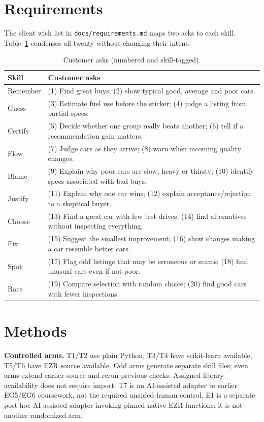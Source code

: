 \documentclass[sigconf,nonacm]{acmart}
\begin{document}
\section{Requirements}
The client wish list in \texttt{docs/requirements.md} maps two asks to each skill. Table~\ref{tab:req} condenses all twenty without changing their intent.
\begin{table}[h]
\caption{Customer asks (numbered and skill-tagged).}\label{tab:req}\centering\scriptsize
\begin{tabular}{@{}lp{}@{}}\toprule
Skill & Customer asks\\\midrule
Remember & (1) Find great buys; (2) show typical good, average and poor cars.\\
Guess & (3) Estimate fuel use before the sticker; (4) judge a listing from partial specs.\\
Certify & (5) Decide whether one group really beats another; (6) tell if a recommendation gain matters.\\
Flow & (7) Judge cars as they arrive; (8) warn when incoming quality changes.\\
Blame & (9) Explain why poor cars are slow, heavy or thirsty; (10) identify specs associated with bad buys.\\
Justify & (11) Explain why one car wins; (12) explain acceptance/rejection to a skeptical buyer.\\
Choose & (13) Find a great car with few test drives; (14) find alternatives without inspecting everything.\\
Fix & (15) Suggest the smallest improvement; (16) show changes making a car resemble better cars.\\
Spot & (17) Flag odd listings that may be erroneous or scams; (18) find unusual cars even if not poor.\\
Race & (19) Compare selection with random choice; (20) find good cars with fewer inspections.\\\bottomrule
\end{tabular}
\end{table}
\section{Methods}
\textbf{Controlled arms.} T1/T2 use plain Python, T3/T4 have scikit-learn available, T5/T6 have EZR source available. Odd arms generate separate skill files; even arms extend earlier source and rerun previous checks. Assigned-library availability does not require import. T7 is an AI-assisted adapter to earlier EG5/EG6 coursework, not the required unaided-human control. E1 is a separate post-hoc AI-assisted adapter invoking pinned native EZR functions; it is not another randomized arm.
\end{document}
